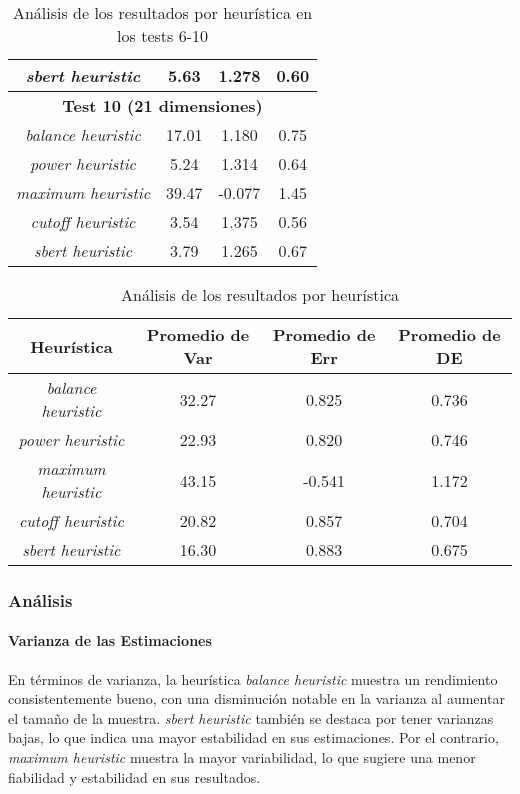 \documentclass{article}
\begin{document}
\begin{table}[H]
{\begin{tabular}{|c|c|c|c|}
\textit{sbert heuristic} & 5.63 & 1.278 & 0.60 \\ \hline
\multicolumn{4}{|c|}{\textbf{Test 10 (21 dimensiones)}} \\ \hline
\textit{balance heuristic} & 17.01 & 1.180 & 0.75 \\ \hline
\textit{power heuristic} & 5.24 & 1.314 & 0.64 \\ \hline
\textit{maximum heuristic} & 39.47 & -0.077 & 1.45 \\ \hline
\textit{cutoff heuristic} & 3.54 & 1.375 & 0.56 \\ \hline
\textit{sbert heuristic} & 3.79 & 1.265 & 0.67 \\ \hline
\end{tabular}%
}
\caption{Análisis de los resultados por heurística en los tests 6-10}
\end{table}

\begin{table}[H]
\centering
\label{table:heuristic_analysis}
\begin{tabular}{|c|c|c|c|}
\hline
\textbf{Heurística} & \textbf{Promedio de Var} & \textbf{Promedio de Err} & \textbf{Promedio de DE} \\ \hline
\textit{balance heuristic} & 32.27 & 0.825 & 0.736 \\ \hline
\textit{power heuristic} & 22.93 & 0.820 & 0.746 \\ \hline
\textit{maximum heuristic} & 43.15 & -0.541 & 1.172 \\ \hline
\textit{cutoff heuristic} & 20.82 & 0.857 & 0.704 \\ \hline
\textit{sbert heuristic} & 16.30 & 0.883 & 0.675 \\ \hline
\end{tabular}
\caption{Análisis de los resultados por heurística}
\end{table}


\subsubsection{Análisis}

\paragraph{Varianza de las Estimaciones}
En términos de varianza, la heurística \textit{balance heuristic} muestra un rendimiento consistentemente bueno, con una disminución notable en la varianza al aumentar el tamaño de la muestra. \textit{sbert heuristic} también se destaca por tener varianzas bajas, lo que indica una mayor estabilidad en sus estimaciones. Por el contrario, \textit{maximum heuristic} muestra la mayor variabilidad, lo que sugiere una menor fiabilidad y estabilidad en sus resultados.
\end{document}
